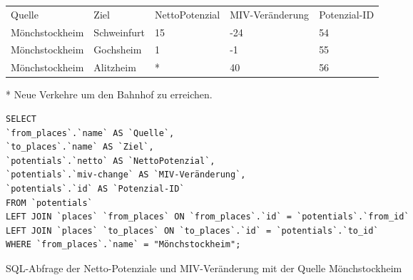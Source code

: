 \begin{tabularx}{\textwidth}{*5{X}}
Quelle & Ziel & NettoPotenzial & MIV-Veränderung & Potenzial-ID\\ 
Mönchstockheim & Schweinfurt & 15 & -24 & 54\\ 
Mönchstockheim & Gochsheim & 1 & -1 & 55\\ 
Mönchstockheim & Alitzheim & * & 40 & 56\\ 
\end{tabularx}    
\newline
\newline
* Neue Verkehre um den Bahnhof zu erreichen.
\newline
\begin{listing}[htbp]
\begin{verbatim}
SELECT
`from_places`.`name` AS `Quelle`, 
`to_places`.`name` AS `Ziel`, 
`potentials`.`netto` AS `NettoPotenzial`, 
`potentials`.`miv-change` AS `MIV-Veränderung`, 
`potentials`.`id` AS `Potenzial-ID`
FROM `potentials`
LEFT JOIN `places` `from_places` ON `from_places`.`id` = `potentials`.`from_id`
LEFT JOIN `places` `to_places` ON `to_places`.`id` = `potentials`.`to_id`
WHERE `from_places`.`name` = "Mönchstockheim";
\end{verbatim}
\caption{SQL-Abfrage der Netto-Potenziale und MIV-Veränderung mit der Quelle Mönchstockheim}\label{lst-fz-moenchstockheim}
\end{listing}
